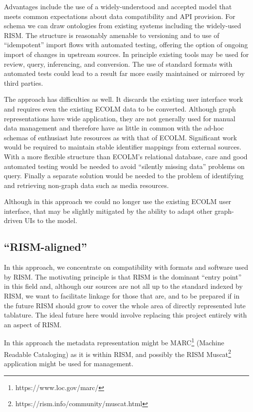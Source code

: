 \documentclass[sigconf, nonacm=true]{acmart}
\begin{document}
\begin{sloppypar}
  Advantages include the use of a widely-understood and accepted model
  that meets common expectations about data compatibility and API
  provision. For schema we can draw ontologies from existing systems
  including the widely-used RISM. The structure is reasonably amenable
  to versioning and to use of ``idempotent'' import flows with
  automated testing, offering the option of ongoing import of changes
  in upstream sources. In principle existing tools may be used for
  review, query, inferencing, and conversion. The use of standard
  formats with automated tests could lead to a result far more easily
  maintained or mirrored by third parties.

  The approach has difficulties as well. It discards the existing user
  interface work and requires even the existing ECOLM data to be
  converted. Although graph representations have wide application,
  they are not generally used for manual data management and therefore
  have as little in common with the ad-hoc schemas of enthusiast lute
  resources as with that of ECOLM. Significant work would be required
  to maintain stable identifier mappings from external sources. With a
  more flexible structure than ECOLM's relational database, care and
  good automated testing would be needed to avoid ``silently missing
  data'' problems on query. Finally a separate solution would be
  needed to the problem of identifying and retrieving non-graph data
  such as media resources.

  Although in this approach we could no longer use the existing ECOLM
  user interface, that may be slightly mitigated by the ability to
  adapt other graph-driven UIs to the model.
  
  \subsection{``RISM-aligned''}

  In this approach, we concentrate on compatibility with formats and
  software used by RISM. The motivating principle is that RISM is the
  dominant ``entry point'' in this field and, although our sources are
  not all up to the standard indexed by RISM, we want to facilitate
  linkage for those that are, and to be prepared if in the future RISM
  should grow to cover the whole area of directly represented lute
  tablature. The ideal future here would involve replacing this
  project entirely with an aspect of RISM.

  In this approach the metadata representation might be
  MARC\footnote{https://www.loc.gov/marc/} (Machine Readable
  Cataloging) as it is within RISM, and possibly the RISM
  Muscat\footnote{https://rism.info/community/muscat.html} application
  might be used for management.


\end{sloppypar}
\end{document}
